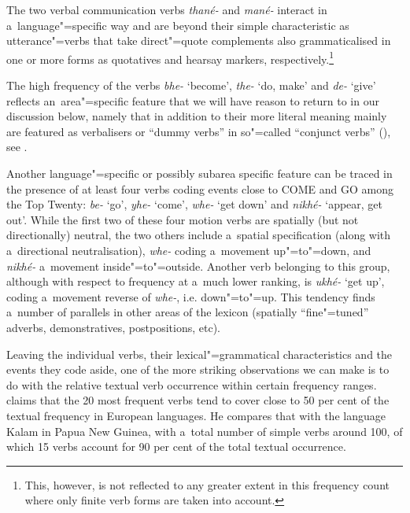 The two verbal communication verbs \textit{thané-} and \textit{mané-} interact in a~language"=specific way and are beyond their simple characteristic as utterance"=verbs that take direct"=quote complements \citep[155]{givon2001a} also grammaticalised in one or more forms as quotatives and hearsay markers, respectively.\footnote{This, however, is not reflected to any greater extent in this frequency count where only finite verb forms are taken into account.}



The high frequency of the verbs \textit{bhe-} `become', \textit{the-} `do, make' and \textit{de-} `give' reflects an~area"=specific feature that we will have reason to return to in our discussion below, namely that in addition to their more literal meaning mainly are featured as verbalisers \citep[368]{masica1991} or ``dummy verbs'' in so"=called ``conjunct verbs'' (\citeyear[326]{masica1991}), see . 



Another language"=specific or possibly subarea specific feature can be traced in the presence of at least four verbs coding events close to COME and GO among the Top Twenty: \textit{be-} `go', \textit{yhe-} `come', \textit{whe-} `get down' and \textit{nikhé-} `appear, get out'. While the first two of these four motion verbs are spatially (but not directionally) neutral, the two others include a~spatial specification (along with a~directional neutralisation), \textit{whe-} coding a~movement up"=to"=down, and \textit{nikhé-} a~movement inside"=to"=outside. Another verb belonging to this group, although with respect to frequency at a~much lower ranking, is \textit{ukhé-} `get up', coding a~movement reverse of \textit{whe-}, i.e. down"=to"=up. This tendency finds a~number of parallels in other areas of the lexicon (spatially ``fine"=tuned'' adverbs, demonstratives, postpositions, etc).



Leaving the individual verbs, their lexical"=grammatical characteristics and the events they code aside, one of the more striking observations we can make is to do with the relative textual verb occurrence within certain frequency ranges. \citet[409]{viberg2006} claims that the 20 most frequent verbs tend to cover close to 50 per cent of the textual frequency in European languages. He compares that with the language Kalam in Papua New Guinea, with a~total number of simple verbs around 100, of which 15 verbs account for 90 per cent of the total textual occurrence. 



